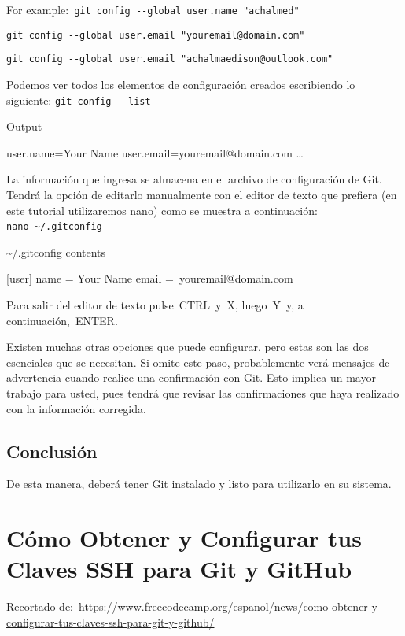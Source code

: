 \documentclass[
  a2paper,
]{article}
\begin{document}
For example:~\texttt{git\ config\ -\/-global\ user.name\ "achalmed"}

\texttt{git\ config\ -\/-global\ user.email\ "youremail@domain.com"}

\texttt{git\ config\ -\/-global\ user.email\ "achalmaedison@outlook.com"}

Podemos ver todos los elementos de configuración creados escribiendo lo
siguiente: \texttt{git\ config\ -\/-list}

Output

user.name=Your Name user.email=youremail@domain.com \ldots{}

La información que ingresa se almacena en el archivo de configuración de
Git. Tendrá la opción de editarlo manualmente con el editor de texto que
prefiera (en este tutorial utilizaremos nano) como se muestra a
continuación: \texttt{nano\ \textasciitilde{}/.gitconfig}~~

\textasciitilde/.gitconfig contents

{[}user{]} name = Your Name email =~youremail@domain.com

Para salir del editor de texto pulse~CTRL~y~X, luego~Y~y, a
continuación,~ENTER.

Existen muchas otras opciones que puede configurar, pero estas son las
dos esenciales que se necesitan. Si omite este paso, probablemente verá
mensajes de advertencia cuando realice una confirmación con Git. Esto
implica un mayor trabajo para usted, pues tendrá que revisar las
confirmaciones que haya realizado con la información corregida.

\hypertarget{conclusiuxf3n}{%
\subsection{Conclusión}\label{conclusiuxf3n}}

De esta manera, deberá tener Git instalado y listo para utilizarlo en su
sistema.

\hypertarget{cuxf3mo-obtener-y-configurar-tus-claves-ssh-para-git-y-github}{%
\section{Cómo Obtener y Configurar tus Claves SSH para Git y
GitHub}\label{cuxf3mo-obtener-y-configurar-tus-claves-ssh-para-git-y-github}}

Recortado
de:~\url{https://www.freecodecamp.org/espanol/news/como-obtener-y-configurar-tus-claves-ssh-para-git-y-github/}
\end{document}
